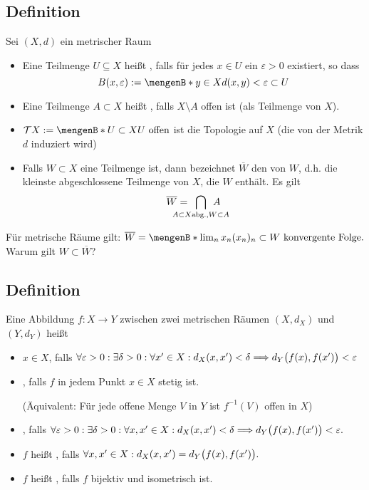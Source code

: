 \subsection[Definition: Offen, abgeschlossen und Abschluss]{Definition} %
\label{sub:12}
Sei $(X,d)$ ein metrischer Raum
\begin{itemize}
	\item Eine Teilmenge $U \subseteq X$ heißt , falls für jedes $x \in U$ ein $\varepsilon > 0$ existiert, so dass 
	\[
		B(x,\varepsilon) := \set[y \in X]{d(x,y) < \varepsilon} \subset U 
	\]
	\item Eine Teilmenge $A \subset X$ heißt , falls $X \setminus A$ offen ist (als Teilmenge von $X$). 
	\item $\mathcal{T}X := \set[U \subset X]{U \text{ offen}} $ ist die Topologie auf $X$ (die von der Metrik $d$ induziert wird)
	\item Falls $W \subset X$ eine Teilmenge ist, dann bezeichnet $\overline{W}$ den  von $W$, d.h. die kleinste abgeschlossene Teilmenge von $X$, die 
	$W$ enthält. Es gilt
	\[
		\overline{W} = \enspace\bigcap_{\mathclap{A \subset X \text{abg.}, W \subset A}} \enspace A 
	\] 
\end{itemize}
Für metrische Räume gilt:
\(
	\overline{W} = \set[\lim_n x_n]{(x_n)_n \subset W \text{ konvergente Folge}}.
\)
Warum gilt $W \subset \overline{W}$?

\subsection[Definition: Stetigkeit, gleichmäßige Stetigkeit, Isometrie]{Definition} %
\label{sub:13}
Eine Abbildung $f : X \to Y$ zwischen zwei metrischen Räumen $(X,d_X)$ und $(Y,d_Y)$ heißt 
\begin{itemize}
	\item {} $x \in X$, falls
	\(
		\forall \varepsilon >0 : \exists \delta >0 : \forall x' \in X : d_X(x,x') < \delta  \Longrightarrow d_Y \enbrace[\big]{f(x), f(x')} < \varepsilon 
	\)
	\item {}, falls $f$ in jedem Punkt $x \in X$ stetig ist.
	
	(Äquivalent: Für jede offene Menge $V$ in $Y$ ist $f ^{-1}(V)$ offen in $X$) 
	\item {}, falls
	\(
		\forall \varepsilon>0 : \exists \delta >0 : \forall x,x' \in X : d_X(x,x') < \delta \Longrightarrow d_Y \enbrace[\big]{f(x), f(x')} < \varepsilon .
	\) 
	\item $f$ heißt , falls 
	\(
		\forall x,x' \in X : d_X(x,x') = d_Y \enbrace[\big]{f(x), f(x')}.
	\)
	\item $f$ heißt , falls $f$ bijektiv und isometrisch ist. 
\end{itemize}

